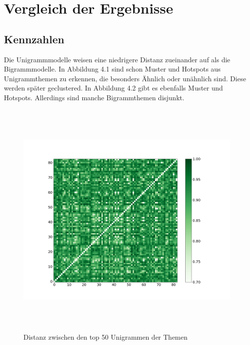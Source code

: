 \chapter{Vergleich der Ergebnisse}




\section{Kennzahlen}

Die Unigrammmodelle weisen eine niedrigere Distanz zueinander auf als die Bigrammmodelle. In Abbildung 4.1 sind schon Muster und Hotspots aus Unigrammthemen zu erkennen, die besonders Ähnlich oder unähnlich sind. Diese werden später geclustered. In Abbildung 4.2 gibt es ebenfalls Muster und Hotspots. Allerdings sind manche Bigrammthemen disjunkt.

\begin{figure}[htpb]
	\centering
	\includegraphics[width=\textwidth,height=12cm,keepaspectratio=true]{img/unigram_jaccard_50_green_07.png}
	\caption{
		Distanz zwischen den top 50 Unigrammen der Themen
	}
	\label{fig:Distanz_Unigramme}
\end{figure}

